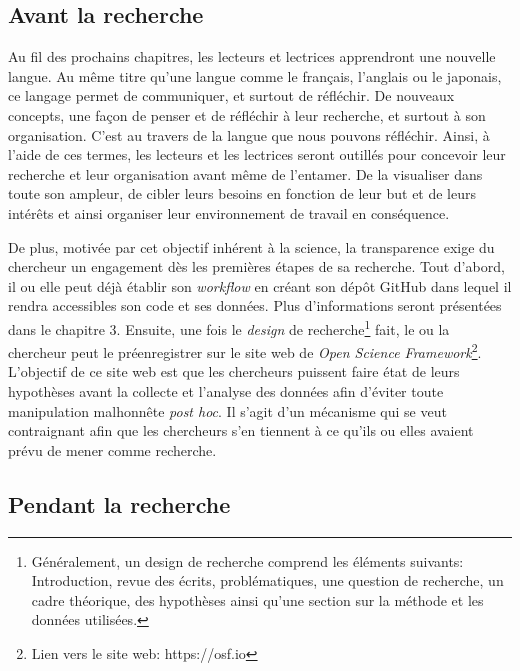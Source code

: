 \documentclass[
  letterpaper,
  DIV=11,
  numbers=noendperiod]{scrreprt}
\begin{document}
\hypertarget{avant-la-recherche}{%
\subsection{Avant la recherche}\label{avant-la-recherche}}

Au fil des prochains chapitres, les lecteurs et lectrices apprendront
une nouvelle langue. Au même titre qu'une langue comme le français,
l'anglais ou le japonais, ce langage permet de communiquer, et surtout
de réfléchir. De nouveaux concepts, une façon de penser et de réfléchir
à leur recherche, et surtout à son organisation. C'est au travers de la
langue que nous pouvons réfléchir. Ainsi, à l'aide de ces termes, les
lecteurs et les lectrices seront outillés pour concevoir leur recherche
et leur organisation avant même de l'entamer. De la visualiser dans
toute son ampleur, de cibler leurs besoins en fonction de leur but et de
leurs intérêts et ainsi organiser leur environnement de travail en
conséquence.

De plus, motivée par cet objectif inhérent à la science, la transparence
exige du chercheur un engagement dès les premières étapes de sa
recherche. Tout d'abord, il ou elle peut déjà établir son
\emph{workflow} en créant son dépôt GitHub dans lequel il rendra
accessibles son code et ses données. Plus d'informations seront
présentées dans le chapitre 3. Ensuite, une fois le \emph{design} de
recherche\footnote{Généralement, un design de recherche comprend les
  éléments suivants: Introduction, revue des écrits, problématiques, une
  question de recherche, un cadre théorique, des hypothèses ainsi qu'une
  section sur la méthode et les données utilisées.} fait, le ou la
chercheur peut le préenregistrer sur le site web de \emph{Open Science
Framework}\footnote{Lien vers le site web: https://osf.io}. L'objectif
de ce site web est que les chercheurs puissent faire état de leurs
hypothèses avant la collecte et l'analyse des données afin d'éviter
toute manipulation malhonnête \emph{post hoc}. Il s'agit d'un mécanisme
qui se veut contraignant afin que les chercheurs s'en tiennent à ce
qu'ils ou elles avaient prévu de mener comme recherche.

\hypertarget{pendant-la-recherche}{%
\subsection{Pendant la recherche}\label{pendant-la-recherche}}
\end{document}
